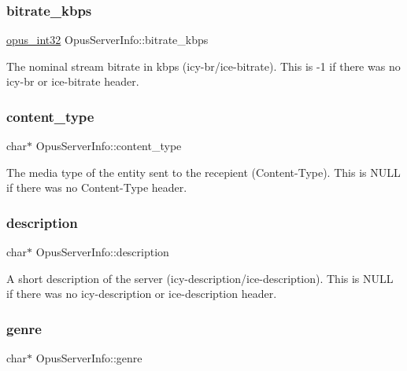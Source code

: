 \subsubsection{\texorpdfstring{bitrate\+\_\+kbps}{bitrate\_kbps}}
{\footnotesize\ttfamily \hyperlink{opus__types_8h_aa4d309d6f80b99dbabebc8f98879ab9a}{opus\+\_\+int32} Opus\+Server\+Info\+::bitrate\+\_\+kbps}

The nominal stream bitrate in kbps (icy-\/br/ice-\/bitrate). This is {\ttfamily -\/1} if there was no {\ttfamily icy-\/br} or {\ttfamily ice-\/bitrate} header. \mbox{\label{struct_opus_server_info_a5f0120b006af1122cbdc72f3cbb68fd7}} 
\subsubsection{\texorpdfstring{content\+\_\+type}{content\_type}}
{\footnotesize\ttfamily char$\ast$ Opus\+Server\+Info\+::content\+\_\+type}

The media type of the entity sent to the recepient (Content-\/\+Type). This is {\ttfamily N\+U\+LL} if there was no {\ttfamily Content-\/\+Type} header. \mbox{\label{struct_opus_server_info_ab16d58f0d67d6473e12629676e2641ca}} 
\subsubsection{\texorpdfstring{description}{description}}
{\footnotesize\ttfamily char$\ast$ Opus\+Server\+Info\+::description}

A short description of the server (icy-\/description/ice-\/description). This is {\ttfamily N\+U\+LL} if there was no {\ttfamily icy-\/description} or {\ttfamily ice-\/description} header. \mbox{\label{struct_opus_server_info_a293431ddf20c3baa3a4751ad08f518bb}} 
\subsubsection{\texorpdfstring{genre}{genre}}
{\footnotesize\ttfamily char$\ast$ Opus\+Server\+Info\+::genre}


